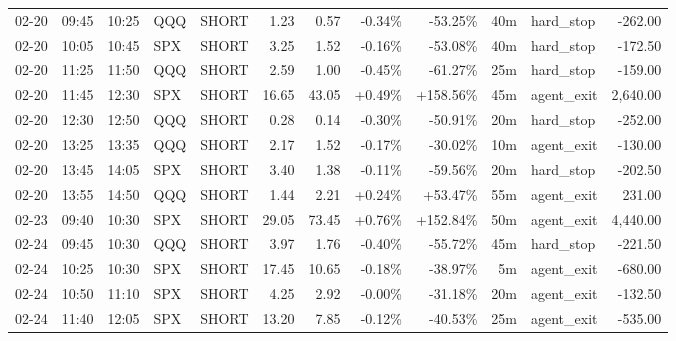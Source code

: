 \documentclass[11pt,a4paper,twoside]{article}
\begin{document}
\begin{center}
\begin{longtable}{>{\color{txtmain}}l l l l l r r r r r >{\color{txtmain}}l r}
02-20 & 09:45 & 10:25 & QQQ & SHORT & 1.23 & 0.57 & \textcolor{lossred}{-0.34\%} & \textcolor{lossred}{-53.25\%} & 40m & hard\_stop & \textcolor{lossred}{-262.00} \\
02-20 & 10:05 & 10:45 & SPX & SHORT & 3.25 & 1.52 & \textcolor{lossred}{-0.16\%} & \textcolor{lossred}{-53.08\%} & 40m & hard\_stop & \textcolor{lossred}{-172.50} \\
02-20 & 11:25 & 11:50 & QQQ & SHORT & 2.59 & 1.00 & \textcolor{lossred}{-0.45\%} & \textcolor{lossred}{-61.27\%} & 25m & hard\_stop & \textcolor{lossred}{-159.00} \\
02-20 & 11:45 & 12:30 & SPX & SHORT & 16.65 & 43.05 & \textcolor{wingreen}{+0.49\%} & \textcolor{wingreen}{+158.56\%} & 45m & agent\_exit & \textcolor{wingreen}{2,640.00} \\
02-20 & 12:30 & 12:50 & QQQ & SHORT & 0.28 & 0.14 & \textcolor{lossred}{-0.30\%} & \textcolor{lossred}{-50.91\%} & 20m & hard\_stop & \textcolor{lossred}{-252.00} \\
02-20 & 13:25 & 13:35 & QQQ & SHORT & 2.17 & 1.52 & \textcolor{lossred}{-0.17\%} & \textcolor{lossred}{-30.02\%} & 10m & agent\_exit & \textcolor{lossred}{-130.00} \\
02-20 & 13:45 & 14:05 & SPX & SHORT & 3.40 & 1.38 & \textcolor{lossred}{-0.11\%} & \textcolor{lossred}{-59.56\%} & 20m & hard\_stop & \textcolor{lossred}{-202.50} \\
02-20 & 13:55 & 14:50 & QQQ & SHORT & 1.44 & 2.21 & \textcolor{wingreen}{+0.24\%} & \textcolor{wingreen}{+53.47\%} & 55m & agent\_exit & \textcolor{wingreen}{231.00} \\
02-23 & 09:40 & 10:30 & SPX & SHORT & 29.05 & 73.45 & \textcolor{wingreen}{+0.76\%} & \textcolor{wingreen}{+152.84\%} & 50m & agent\_exit & \textcolor{wingreen}{4,440.00} \\
02-24 & 09:45 & 10:30 & QQQ & SHORT & 3.97 & 1.76 & \textcolor{lossred}{-0.40\%} & \textcolor{lossred}{-55.72\%} & 45m & hard\_stop & \textcolor{lossred}{-221.50} \\
02-24 & 10:25 & 10:30 & SPX & SHORT & 17.45 & 10.65 & \textcolor{lossred}{-0.18\%} & \textcolor{lossred}{-38.97\%} & 5m & agent\_exit & \textcolor{lossred}{-680.00} \\
02-24 & 10:50 & 11:10 & SPX & SHORT & 4.25 & 2.92 & \textcolor{lossred}{-0.00\%} & \textcolor{lossred}{-31.18\%} & 20m & agent\_exit & \textcolor{lossred}{-132.50} \\
02-24 & 11:40 & 12:05 & SPX & SHORT & 13.20 & 7.85 & \textcolor{lossred}{-0.12\%} & \textcolor{lossred}{-40.53\%} & 25m & agent\_exit & \textcolor{lossred}{-535.00} \\

\end{longtable}
\end{center}
\end{document}
